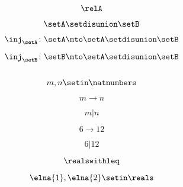 \begin{forslides}
    \begin{equation}
        \label{eq:feedback-120}
        \relA
    \end{equation}

    \begin{equation}
        \label{eq:feedback-121}
        \setA \setdisunion \setB
    \end{equation}

    \begin{equation}
        \label{eq:feedback-122}
        \inj_\setA\colon \setA\mto \setA \setdisunion\setB
    \end{equation}

    \begin{equation}
        \label{eq:feedback-123}
        \inj_\setB\colon \setB\mto \setA \setdisunion\setB
    \end{equation}

    \begin{equation}
        \label{eq:feedback-124}
    \end{equation}

    \begin{equation}
        \label{eq:feedback-125}
        m,n\setin \natnumbers
    \end{equation}

    \begin{equation}
        \label{eq:feedback-126}
        m\to n
    \end{equation}

    \begin{equation}
        \label{eq:feedback-127}
        m | n
    \end{equation}

    \begin{equation}
        \label{eq:feedback-128}
        6\to 12
    \end{equation}

    \begin{equation}
        \label{eq:feedback-129}
        6 | 12
    \end{equation}

    \begin{equation}
        \label{eq:feedback-130}
        \realswithleq
    \end{equation}

    \begin{equation}
        \label{eq:feedback-131}
        \elna{1},\elna{2}\setin \reals
    \end{equation}


\end{forslides}
